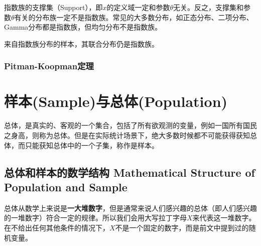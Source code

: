 \documentclass[UTF8]{ctexbook}
\begin{document}
指数族的支撑集（Support），即$x$的定义域一定和参数$\theta$无关。反之，支撑集和参数$\theta$有关的分布族一定不是指数族。常见的大多数分布，如正态分布、二项分布、Gamma分布都是指数族，但均匀分布不是指数族。

来自指数族分布的样本，其联合分布仍是指数族。
\subsection{Pitman-Koopman定理}
%
%
\chapter{样本(Sample)与总体(Population)}
总体，是真实的、客观的一个集合，包括了所有欲观测的变量，例如一国所有国民之身高，则称为总体。但是在实际统计场景下，绝大多数时候都不可能获得获知总体，而只能获知总体中的一个子集，称作是样本。

\section{总体和样本的数学结构 Mathematical Structure of Population and Sample}
总体从数学上来说是\textbf{一大堆数字}，但是通常来说人们感兴趣的总体（即人们感兴趣的一堆数字）符合一定的规律。所以我们会用大写拉丁字母$X$来代表这一堆数字。在不给出任何其他条件的情况下，$X$不是一个固定的数字，而是前文中提到过的随机变量。
\end{document}
